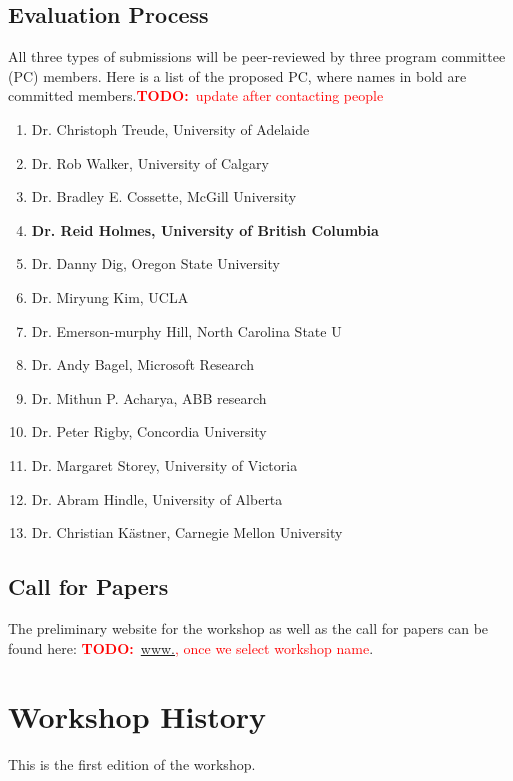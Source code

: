 \documentclass[10pt, conference]{IEEEtran}
\newcommand{\todo}[1]{{\textcolor{red}{\textbf{TODO:}~#1}}}
\begin{document}
\subsection{Evaluation Process}
All three types of submissions will be peer-reviewed by three program committee (PC) members. Here is a list of the proposed PC, where names in bold are committed members.\todo{update after contacting people}

\begin{enumerate}
\setlength\itemsep{5pt}
\item Dr. Christoph Treude, University of Adelaide 
\item Dr. Rob Walker, University of Calgary
\item Dr. Bradley E. Cossette, McGill University
\item \textbf{Dr. Reid Holmes, University of British Columbia}
\item Dr. Danny Dig, Oregon State University
\item Dr. Miryung Kim, UCLA
\item Dr. Emerson-murphy Hill, North Carolina State U
\item Dr. Andy Bagel, Microsoft Research
\item Dr. Mithun P. Acharya, ABB research
\item Dr. Peter Rigby, Concordia University
\item Dr. Margaret Storey, University of Victoria
\item Dr. Abram Hindle, University of Alberta
\item Dr. Christian K\"{a}stner, Carnegie Mellon University
\end{enumerate}

\subsection{Call for Papers}
The preliminary website for the workshop as well as the call for papers can be found here: \todo{\url{www.}, once we select workshop name}.

\section{Workshop History}

This is the first edition of the workshop.
\end{document}
